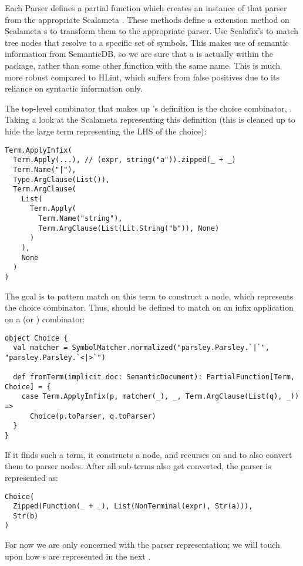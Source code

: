 \documentclass[../../main.tex]{subfiles}
\begin{document}
Each Parser defines a partial function  which creates an instance of that parser from the appropriate Scalameta .
These  methods define a  extension method on Scalameta s to transform them to the appropriate parser.
Use Scalafix's  to match tree nodes that resolve to a specific set of symbols.
This makes use of semantic information from SemanticDB, so we are sure that a \scala{<*>} is actually within the  package, rather than some other function with the same name.
This is much more robust compared to HLint, which suffers from false positives due to its reliance on syntactic information only.

The top-level combinator that makes up 's definition is the choice combinator, \scala{|}.
Taking a look at the Scalameta  representing this definition 
(this is cleaned up to hide the large term representing the LHS of the choice):
\begin{verbatim}
Term.ApplyInfix(
  Term.Apply(...), // (expr, string("a")).zipped(_ + _)
  Term.Name("|"),
  Type.ArgClause(List()),
  Term.ArgClause(
    List(
      Term.Apply(
        Term.Name("string"),
        Term.ArgClause(List(Lit.String("b")), None)
      )
    ),
    None
  )
)
\end{verbatim}
%
The goal is to pattern match on this term to construct a  node, which represents the choice combinator.
Thus,  should be defined to match on an infix application on a \scala{|} (or \scala{<|>}) combinator:
\begin{verbatim}
object Choice {
  val matcher = SymbolMatcher.normalized("parsley.Parsley.`|`", "parsley.Parsley.`<|>`")

  def fromTerm(implicit doc: SemanticDocument): PartialFunction[Term, Choice] = {
    case Term.ApplyInfix(p, matcher(_), _, Term.ArgClause(List(q), _)) =>
      Choice(p.toParser, q.toParser)
  }
}
\end{verbatim}
If it finds such a term, it constructs a  node, and recurses on  and  to also convert them to parser nodes.
After all sub-terms also get converted, the  parser is represented as:
\begin{verbatim}
Choice(
  Zipped(Function(_ + _), List(NonTerminal(expr), Str(a))),
  Str(b)
)
\end{verbatim}
For now we are only concerned with the parser representation; we will touch upon how s are represented in the next .
\end{document}
